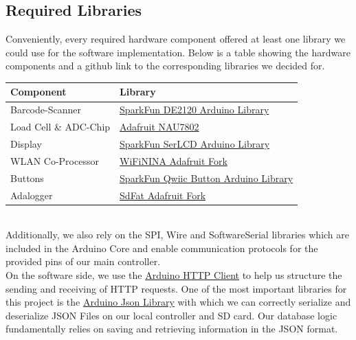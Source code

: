 \documentclass{article}
\begin{document}
\subsection{Required Libraries}
Conveniently, every required hardware component offered at least one library we could use for the software implementation.
Below is a table showing the hardware components and a github link to the corresponding libraries we decided for.
\\[10pt]
\begin{tabular}{l l}
	\hline
	Component             & Library                                                                                                         \\
	\hline
	Barcode-Scanner       & \href{https://github.com/sparkfun/SparkFun_DE2120_Arduino_Library}{SparkFun DE2120 Arduino Library}             \\
	Load Cell \& ADC-Chip & \href{https://github.com/adafruit/Adafruit_NAU7802}{Adafruit NAU7802}                                           \\
	Display               & \href{https://github.com/sparkfun/SparkFun_SerLCD_Arduino_Library}{SparkFun SerLCD Arduino Library}             \\
	WLAN Co-Processor     & \href{https://github.com/adafruit/WiFiNINA}{WiFiNINA Adafruit Fork}                                             \\
	Buttons               & \href{https://github.com/sparkfun/SparkFun_Qwiic_Button_Arduino_Library}{SparkFun Qwiic Button Arduino Library} \\
	Adalogger             & \href{https://github.com/adafruit/SdFat}{SdFat Adafruit Fork}                                                   \\
	\hline
\end{tabular} \\[10pt]
Additionally, we also rely on the SPI, Wire and SoftwareSerial libraries which are included in the Arduino Core and enable communication protocols for the provided pins of our main controller. \\
On the software side, we use the \href{https://github.com/arduino-libraries/ArduinoHttpClient}{Arduino HTTP Client} to help us structure the sending and receiving of HTTP requests.
One of the most important libraries for this project is the \href{https://github.com/bblanchon/ArduinoJson}{Arduino Json Library} with which we can correctly serialize and deserialize JSON Files on our local controller and SD card.
Our database logic fundamentally relies on saving and retrieving information in the JSON format. \\
\end{document}

